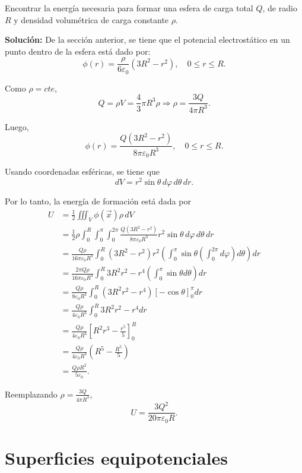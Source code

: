 \begin{ejemplo}
    Encontrar la energía necesaria para formar una esfera de carga total $Q$, de radio $R$ y densidad volumétrica de carga constante $\rho$.

\textbf{Solución:} De la sección anterior, se tiene que el potencial electrostático en un punto dentro de la esfera está dado por:
$$\phi(r)= \frac{\rho}{6 \varepsilon_0}(3R^2 - r^2), \quad 0 \leq r \leq R. $$

Como $\rho = cte$,
$$Q = \rho V = \frac{4}{3} \pi R^3 \rho \Rightarrow  \rho = \frac{3 Q}{4\pi R^3}.$$

Luego,
$$\phi(r)= \frac{Q(3R^2-r^2)}{8 \pi \varepsilon_0R^3}, \quad 0 \leq r \leq R. $$

Usando coordenadas esféricas, se tiene que
$$dV = r^2 \sin \theta \,d\varphi\,d\theta\,dr.$$

Por lo tanto, la energía de formación está dada por
\begin{align*}
    U &= \frac{1}{2} \iiint_V \phi(\Vec{x}) \rho \,dV \\
    &= \frac{1}{2} \rho \int_0^R \int_0^{\pi} \int_0^{2\pi} \frac{Q(3R^2-r^2)}{8 \pi \varepsilon_0 R^3} r^2 \sin \theta \,d\varphi \,d\theta\, dr\\
    &= \frac{Q \rho}{16 \pi \varepsilon_0 R^3} \int_0^R (3R^2 - r^2)r^2 \left(  \int_0^{\pi} \sin \theta \left( \int_0^{2\pi} d\varphi \right) d\theta \right) dr \\
    &=  \frac{2\pi Q \rho}{16 \pi \varepsilon_0 R^3} \int_0^R 3 R^2r^2-r^4 \left( \int_0^{\pi} \sin \theta d\theta  \right) dr \\
    &= \frac{Q \rho}{8 \varepsilon_0 R^3} \int_0^R (3R^2 r^2 -r^4) [- \cos\theta]_0^{\pi} dr \\
&= \frac{Q \rho}{4\varepsilon_0 R^3} \int_0^R 3R^2r^2-r^4 dr \\
&=  \frac{Q \rho}{4\varepsilon_0 R^3} \left[ R^2r^3 - \frac{r^5}{5}  \right]_0^R \\
&= \frac{Q \rho}{4 \varepsilon_0 R^3} \left( R^5 - \frac{R^5}{5}  \right) \\
&= \frac{Q \rho R^2}{5 \varepsilon_0}.
\end{align*}

Reemplazando $\rho = \frac{3 Q}{4\pi R^3}$,
$$U = \frac{3 Q^2}{20 \pi \varepsilon_0 R}.$$
\end{ejemplo}


\section{Superficies equipotenciales}

